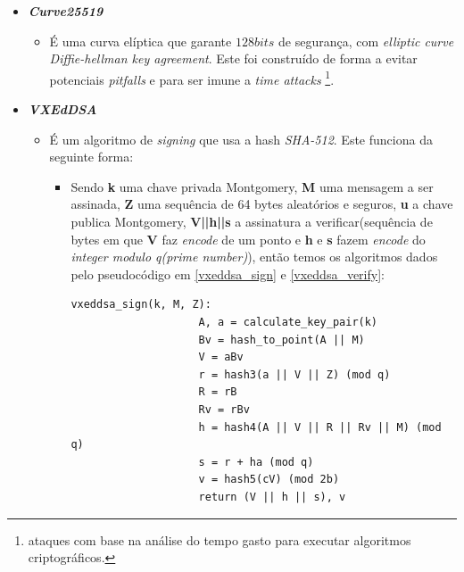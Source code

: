 \begin{itemize}
    \item \textit{\textbf{Curve25519}}
    \begin{itemize}
        \item É uma curva elíptica que garante $128 bits$ de segurança, com \textit{elliptic curve Diffie-hellman key agreement}. Este foi construído de forma a evitar potenciais \textit{pitfalls} e para ser imune a \textit{time attacks} \footnote{ataques com base na análise do tempo gasto para executar algoritmos criptográficos.}.
    \end{itemize}

    \item \textit{\textbf{VXEdDSA}}
    \begin{itemize}
        \item É um algoritmo de \textit{signing} que usa a hash \textit{SHA-512}. Este funciona da seguinte forma:
        \begin{itemize}
            \item Sendo \textbf{k} uma chave privada Montgomery, \textbf{M} uma mensagem a ser assinada, \textbf{Z} uma sequência de 64 bytes aleatórios e seguros, \textbf{u} a chave publica Montgomery, \textbf{V||h||s} a assinatura a verificar(sequência de bytes em que \textbf{V} faz \textit{encode} de um ponto e \textbf{h} e \textbf{s} fazem \textit{encode} do \textit{integer modulo q(prime number)}), então temos os algoritmos dados pelo pseudocódigo em \ref{vxeddsa_sign} e \ref{vxeddsa_verify}:
            
            \begin{lstlisting}[caption=Assinatura de um documento,captionpos=b, label={vxeddsa_sign}]
                vxeddsa_sign(k, M, Z):
                    A, a = calculate_key_pair(k)
                    Bv = hash_to_point(A || M)
                    V = aBv
                    r = hash3(a || V || Z) (mod q)
                    R = rB
                    Rv = rBv
                    h = hash4(A || V || R || Rv || M) (mod q)
                    s = r + ha (mod q)
                    v = hash5(cV) (mod 2b)
                    return (V || h || s), v
                \end{lstlisting}
            

\end{itemize}
\end{itemize}
\end{itemize}
